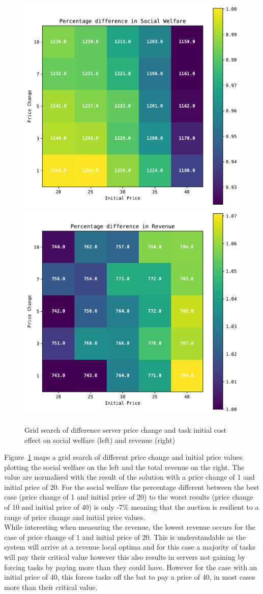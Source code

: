 \begin{figure}[h]
    \centering
    \includegraphics[width=0.45\linewidth]{figs/dia_heuristics/social_welfare_grid.pdf}
    \includegraphics[width=0.45\linewidth]{figs/dia_heuristics/revenue_grid.pdf}
    \caption{Grid search of difference server price change and task initial cost effect on social welfare (left) and
             revenue (right)}
    \label{fig:dia-sw-rev-grid-search}
\end{figure}

Figure~\ref{fig:dia-sw-rev-grid-search} maps a grid search of different price change and initial price values plotting
the social welfare on the left and the total revenue on the right. The value are normalised with the result of the
solution with a price change of 1 and initial price of 20. For the social welfare the percentage different between the
best case (price change of 1 and initial price of 20) to the worst results (price change of 10 and initial price of 40)
is only -7\% meaning that the auction is resilient to a range of price change and initial price values. \\
While interesting when measuring the revenue, the lowest revenue occurs for the case of price change of 1 and initial
price of 20. This is understandable as the system will arrive at a revenue local optima and for this case a majority of
tasks will pay their critical value however this also results in servers not gaining by forcing tasks by paying more
than they could have. However for the case with an initial price of 40, this forces tasks off the bat to pay a price of
40, in most cases more than their critical value.

